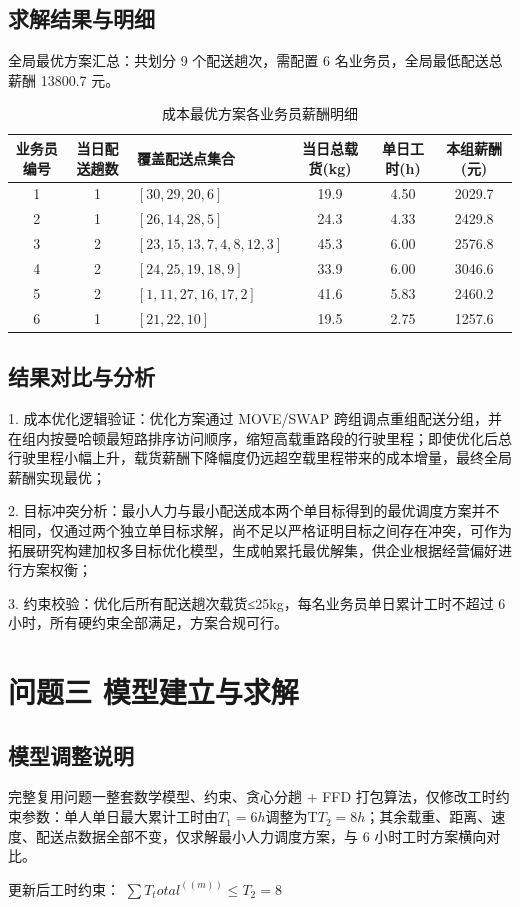 \documentclass[withoutpreface,bwprint]{cumcmthesis} %
\begin{document}
\subsection{求解结果与明细}
全局最优方案汇总：共划分 9 个配送趟次，需配置 6 名业务员，全局最低配送总薪酬 13800.7 元。
\begin{table}[htbp]
\centering
\setlength{\tabcolsep}{4pt}
\footnotesize
\caption{成本最优方案各业务员薪酬明细}
\begin{tabularx}{\textwidth}{c c >{\RaggedRight\arraybackslash}X c c c}
\toprule
业务员编号 & 当日配送趟数 & 覆盖配送点集合 & 当日总载货(kg) & 单日工时(h) & 本组薪酬(元) \\
\midrule
1 & 1 & $[30,29,20,6]$ & 19.9 & 4.50 & 2029.7 \\
2 & 1 & $[26,14,28,5]$ & 24.3 & 4.33 & 2429.8 \\
3 & 2 & $[23,15,13,7,4,8,12,3]$ & 45.3 & 6.00 & 2576.8 \\
4 & 2 & $[24,25,19,18,9]$ & 33.9 & 6.00 & 3046.6 \\
5 & 2 & $[1,11,27,16,17,2]$ & 41.6 & 5.83 & 2460.2 \\
6 & 1 & $[21,22,10]$ & 19.5 & 2.75 & 1257.6 \\
\bottomrule
\end{tabularx}
\label{tab:salary_detail}
\end{table}



\subsection{结果对比与分析}
1.	成本优化逻辑验证：优化方案通过 MOVE/SWAP 跨组调点重组配送分组，并在组内按曼哈顿最短路排序访问顺序，缩短高载重路段的行驶里程；即使优化后总行驶里程小幅上升，载货薪酬下降幅度仍远超空载里程带来的成本增量，最终全局薪酬实现最优；
\par2.	目标冲突分析：最小人力与最小配送成本两个单目标得到的最优调度方案并不相同，仅通过两个独立单目标求解，尚不足以严格证明目标之间存在冲突，可作为拓展研究构建加权多目标优化模型，生成帕累托最优解集，供企业根据经营偏好进行方案权衡；
\par3.	约束校验：优化后所有配送趟次载货≤25kg，每名业务员单日累计工时不超过 6 小时，所有硬约束全部满足，方案合规可行。

\section{问题三 模型建立与求解}
\subsection{模型调整说明}
完整复用问题一整套数学模型、约束、贪心分趟 + FFD 打包算法，仅修改工时约束参数：单人单日最大累计工时由\(T_1=6h\)调整为T\( T_2=8h\)；其余载重、距离、速度、配送点数据全部不变，仅求解最小人力调度方案，与 6 小时工时方案横向对比。
\par 更新后工时约束：
\(∑T_total^((m))≤T_2=8\)
\end{document}
